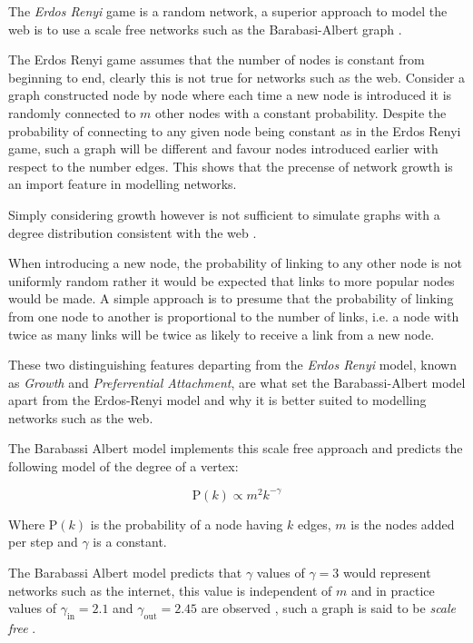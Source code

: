 \documentclass[11pt]{report}
\begin{document}
The \emph{Erdos Renyi} game is a random network, a superior approach to model the web
is to use a scale free networks \cite{barabasiPhysicsWeb2001} such as the
Barabasi-Albert graph \cite{barabasiScalefreeCharacteristicsRandom2000}.


The Erdos Renyi game assumes that the number of nodes is constant from beginning
to end, clearly this is not true for networks such as the web. Consider a graph
constructed node by node where each time a new node is introduced it is randomly
connected to \(m\) other nodes with a constant probability. Despite the probability of
connecting to any given node being constant as in the Erdos Renyi game, such a
graph will be different and favour nodes introduced earlier with respect to the number edges.
This shows that the precense of network growth is an import feature in modelling
networks.

Simply considering growth however is not sufficient to simulate graphs with a
degree distribution consistent with the web
\cite[Ch. 7]{zengPracticalSimulationMethod2013}.

When introducing a new node, the probability of linking to any other node is not
uniformly random rather it would be
expected that links to more popular nodes would be made. A simple approach is to presume that the probability of linking from
one node to another is proportional to the number of links, i.e. a node with
twice as many links will be twice as likely to receive a link from a new node.

These two distinguishing features departing from the \emph{Erdos Renyi} model, known as \emph{Growth} and \emph{Preferrential Attachment}, are what set the Barabassi-Albert model apart from the Erdos-Renyi model and why it is better suited to modelling networks such as the web. \cite[Ch. 7]{barabasiLinkedNewScience2002}




The Barabassi Albert model implements this scale free approach and predicts the following model of the degree of a vertex:

\[
\mathrm{P}\left(k\right) \propto m^2 k^{-\gamma}
\]


Where \(\mathrm{P}\left(k\right)\) is the probability of a node having \(k\) edges, \(m\) is the nodes added per step and \(\gamma\) is a constant.

The Barabassi Albert model predicts that \(\gamma\) values of \(\gamma=3\) would
represent networks such as the internet, this value is independent of \(m\) and
in practice values of \(\gamma_{\mathrm{in}}= 2.1\) and
\(\gamma_{\mathrm{out}} = 2.45\) are observed
\cite[]{barabasiScalefreeCharacteristicsRandom2000}, such a graph is said to be
\textit{scale free} \cite[.2]{langvilleGooglePageRankScience2012}.
\end{document}
